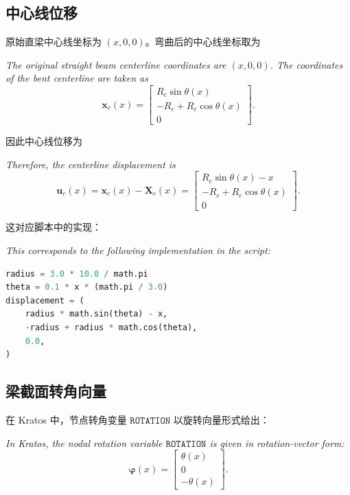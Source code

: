 \documentclass[UTF8,a4paper,11pt]{ctexart}
\begin{document}
\subsection{中心线位移}

原始直梁中心线坐标为 \((x,0,0)\)。弯曲后的中心线坐标取为
\par\noindent\emph{The original straight beam centerline coordinates are \((x,0,0)\). The coordinates of the bent centerline are taken as}
\begin{equation}
  \bm{x}_c(x) =
  \begin{bmatrix}
    R_c \sin \theta(x) \\
    -R_c + R_c \cos \theta(x) \\
    0
  \end{bmatrix}.
\end{equation}

因此中心线位移为
\par\noindent\emph{Therefore, the centerline displacement is}
\begin{equation}
  \bm{u}_c(x)
  =
  \bm{x}_c(x) - \bm{X}_c(x)
  =
  \begin{bmatrix}
    R_c \sin \theta(x) - x \\
    -R_c + R_c \cos \theta(x) \\
    0
  \end{bmatrix}.
\end{equation}

这对应脚本中的实现：
\par\noindent\emph{This corresponds to the following implementation in the script:}
\begin{lstlisting}[language=Python]
radius = 3.0 * 10.0 / math.pi
theta = 0.1 * x * (math.pi / 3.0)
displacement = (
    radius * math.sin(theta) - x,
    -radius + radius * math.cos(theta),
    0.0,
)
\end{lstlisting}

\subsection{梁截面转角向量}

在 Kratos 中，节点转角变量 \(\texttt{ROTATION}\) 以旋转向量形式给出：
\par\noindent\emph{In Kratos, the nodal rotation variable \(\texttt{ROTATION}\) is given in rotation-vector form:}
\begin{equation}
  \bm{\varphi}(x)
  =
  \begin{bmatrix}
    \theta(x) \\ 0 \\ -\theta(x)
  \end{bmatrix}.
\end{equation}
\end{document}
